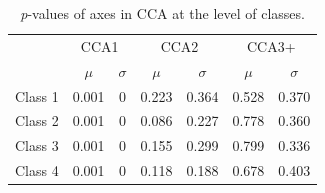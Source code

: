 		\begin{table}[h!] 
			
			\small
			\caption{\textit{p}-values of axes in CCA at the level of classes.}
			\centering
			
			\begin{tabular}{@{}lcccccc@{}}
				
				\toprule
				& \multicolumn{2}{c}{CCA1} & \multicolumn{2}{c}{CCA2} & \multicolumn{2}{c}{CCA3+}\\\cmidrule(l){2-3} \cmidrule(l){4-5} \cmidrule(l){6-7}
				& $\mu$ & $\sigma$ & $\mu$ & $\sigma$ & $\mu$ & $\sigma$\\
				\hline
				Class 1 & 0.001 & 0 & 0.223 & 0.364 & 0.528 & 0.370\\ %
				Class 2 & 0.001 & 0 & 0.086 & 0.227 & 0.778 & 0.360\\ %
				Class 3 & 0.001 & 0 & 0.155 & 0.299 & 0.799 & 0.336\\ %
				Class 4 & 0.001 & 0 & 0.118 & 0.188 & 0.678 & 0.403\\ %
				\toprule
				
			\end{tabular}
			
			\label{tab:ccasm3}
			
		\end{table} 
		 
		 \vspace{10em}
		 
